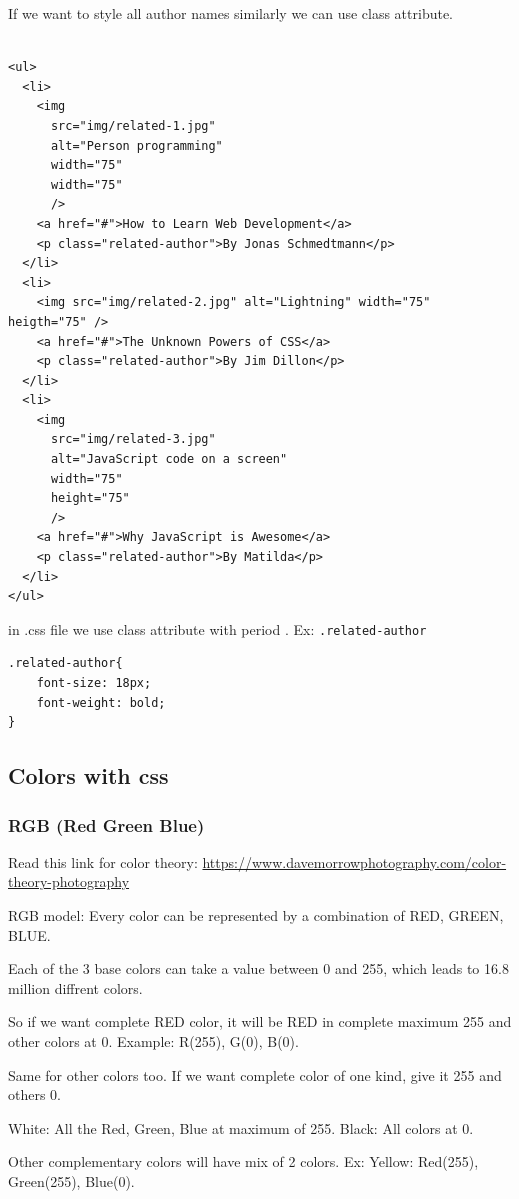 \documentclass[11pt]{article}
\begin{document}
If we want to style all author names similarly we can use class attribute.

\begin{verbatim}

<ul>
  <li>
    <img
      src="img/related-1.jpg"
      alt="Person programming"
      width="75"
      width="75"
      />
    <a href="#">How to Learn Web Development</a>
    <p class="related-author">By Jonas Schmedtmann</p>
  </li>
  <li>
    <img src="img/related-2.jpg" alt="Lightning" width="75" heigth="75" />
    <a href="#">The Unknown Powers of CSS</a>
    <p class="related-author">By Jim Dillon</p>
  </li>
  <li>
    <img
      src="img/related-3.jpg"
      alt="JavaScript code on a screen"
      width="75"
      height="75"
      />
    <a href="#">Why JavaScript is Awesome</a>
    <p class="related-author">By Matilda</p>
  </li>
</ul>
\end{verbatim}

in .css file we use class attribute with period . Ex: \texttt{.related-author}

\begin{verbatim}
.related-author{
    font-size: 18px;
    font-weight: bold;
}
\end{verbatim}
\subsection{Colors with css}
\label{sec:org984ae03}
\subsubsection{RGB (Red Green Blue)}
\label{sec:orgad291c7}

Read this link for color theory:
\url{https://www.davemorrowphotography.com/color-theory-photography}

RGB model: Every color can be represented by a combination of RED, GREEN, BLUE.

Each of the 3 base colors can take a value between 0 and 255, which leads to 16.8 million diffrent colors.

So if we want complete RED color, it will be RED in complete maximum 255 and other colors at 0. Example: R(255), G(0), B(0).

Same for other colors too. If we want complete color of one kind, give it 255 and others 0.

White: All the Red, Green, Blue at maximum of 255.
Black: All colors at 0.

Other complementary colors will have mix of 2 colors. Ex: Yellow: Red(255), Green(255), Blue(0).
\end{document}
